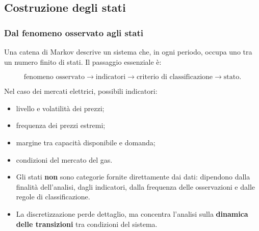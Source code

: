 \documentclass[handout]{beamer}%
\newenvironment{stepitemize}{\begin{itemize}[<+->]}{\end{itemize} }
\providecommand{\QTR}[2]{\csname #1\endcsname{#2}}
\begin{document}
\subsection{Costruzione degli stati}%

\begin{frame}%
%

\frametitle{Dal fenomeno osservato agli stati}%
%

%


Una catena di Markov descrive un sistema che, in ogni periodo, occupa uno tra
un numero finito di stati. Il passaggio essenziale \`{e}:%

\[
\text{fenomeno osservato} \longrightarrow\text{indicatori} \longrightarrow
\text{criterio di classificazione} \longrightarrow\text{stato}.
\]


\medskip

Nel caso dei mercati elettrici, possibili indicatori:

\begin{stepitemize}


\item livello e volatilit\`{a} dei prezzi;

\item frequenza dei prezzi estremi;

\item margine tra capacit\`{a} disponibile e domanda;

\item condizioni del mercato del gas.
\end{stepitemize}

\medskip

\begin{stepitemize}
\item Gli stati \textbf{non} sono categorie fornite direttamente dai dati:
dipendono dalla finalit\`{a} dell'analisi, dagli indicatori, dalla frequenza
delle osservazioni e dalle regole di classificazione.

\item La discretizzazione perde dettaglio, ma concentra l'analisi sulla
\textbf{dinamica delle transizioni} tra condizioni del sistema.
\end{stepitemize}%

\transboxout
\end{frame}%
\end{document}
